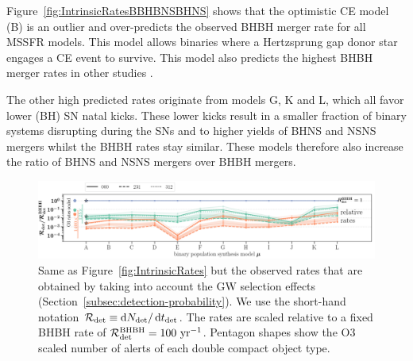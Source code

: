 \documentclass[twocolumn]{aastex63}
\newcommand\rate{\mathcal{R}}
\newcommand\bhnsSingle{BHNS\xspace}
\newcommand{\yearmin}{\ensuremath{\,\rm{yr}^{-1}}\xspace}
\newcommand{\tdet}{\ensuremath{{t}_{\rm{det}}}\xspace}
\newcommand{\Ndet}{\ensuremath{{N}_{\rm{det}}}\xspace}
\newcommand*\diff{\mathop{}\!\mathrm{d}}
\begin{document}
Figure~\ref{fig:IntrinsicRatesBBHBNSBHNS} shows that the optimistic \ac{CE} model (B) is an outlier and over-predicts  the observed \ac{BHBH} merger rate for all \ac{MSSFR} models. This model  allows binaries where a Hertzsprung gap donor star engages a \ac{CE} event to survive. This model also predicts   the highest \ac{BHBH} merger rates in other studies \citep[e.g.][]{2012ApJ...759...52D,2013ApJ...779...72D, 2015ApJ...806..263D, 2019MNRAS.490.3740N}. 

The other high predicted rates originate from models  G, K and L, which all favor lower (BH) SN natal kicks. These lower kicks result in  a smaller fraction of  binary systems disrupting during the \acp{SN} and to  higher yields of \bhnsSingle and \ac{NSNS} mergers whilst  the   \ac{BHBH} rates stay similar. These models therefore  also increase the ratio of \bhnsSingle and \ac{NSNS} mergers over \ac{BHBH} mergers.    


%
\begin{figure}
    \centering
\includegraphics[width=1.0\textwidth]{../PlottingScripts/8_PredictedRates_BPS_and_MSSFR_variations/RatesRatios_observed.png} 
    \caption{Same as Figure~\ref{fig:IntrinsicRates} but  the observed rates that are obtained by taking into account the \ac{GW} selection effects (Section~\ref{subsec:detection-probability}). We use the short-hand notation $\rate_{\rm{det}} \equiv \diff \Ndet / \diff \tdet$. The rates are scaled relative to a fixed \ac{BHBH} rate of   $\rate_{\rm{det}}^{\rm{BHBH}}=100$\yearmin. Pentagon shapes show the O3 scaled number of alerts of each double compact object type. }%
    \label{fig:ObservedRatesRatiosBBHBNSBHNS}
\end{figure}
%
\end{document}
